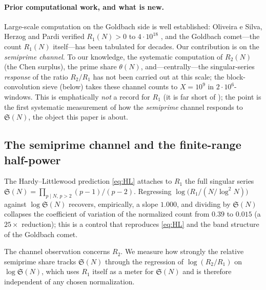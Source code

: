 \documentclass[]{interact}%
\newcommand{\sing}{\mathfrak S}
\begin{document}
\paragraph{Prior computational work, and what is new.}
Large-scale computation on the Goldbach side is well established: Oliveira e Silva, Herzog and
Pardi verified $R_1(N)>0$ to $4\cdot10^{18}$ \citep{silva2014}, and the Goldbach comet---the count
$R_1(N)$ itself---has been tabulated for decades. Our contribution is on the \emph{semiprime
channel}. To our knowledge, the systematic computation of $R_2(N)$ (the Chen surplus), the prime
share $\theta(N)$, and---centrally---the singular-series \emph{response} of the ratio $R_2/R_1$ has
not been carried out at this scale; the block-convolution sieve (below) takes these channel counts
to $X=10^{9}$ in $2\cdot10^{6}$-windows. This is emphatically \emph{not} a record for $R_1$ (it is
far short of \citep{silva2014}); the point is the first systematic measurement of how the
\emph{semiprime} channel responds to $\sing(N)$, the object this paper is about.

\subsection{The semiprime channel and the finite-range half-power}
\label{sec:singexp}

The Hardy--Littlewood prediction \eqref{eq:HL} attaches to $R_1$ the full singular
series $\sing(N)=\prod_{p\mid N,\,p>2}(p-1)/(p-2)$. Regressing
$\log\!\big(R_1/(N/\log^2N)\big)$ against $\log\sing(N)$ recovers, empirically, a slope
$1.000$, and dividing by $\sing(N)$ collapses the coefficient of variation of the
normalized count from $0.39$ to $0.015$ (a $25\times$ reduction); this is a control
that reproduces \eqref{eq:HL} and the band structure of the Goldbach comet.

The channel observation concerns $R_2$. We measure how strongly the relative semiprime
share tracks $\sing(N)$ through the regression of $\log(R_2/R_1)$ on $\log\sing(N)$, which
uses $R_1$ itself as a meter for $\sing(N)$ and is therefore independent of any chosen
normalization.
\end{document}
